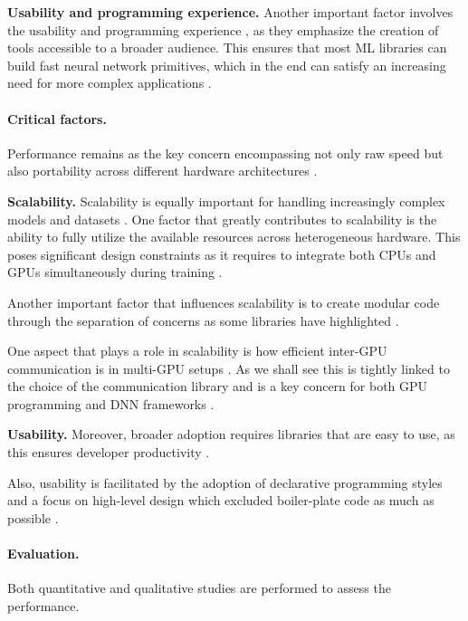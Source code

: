 \textbf{Usability and programming experience.}
Another important factor involves the usability and programming experience ,
as they emphasize the creation of tools accessible to a broader audience. This ensures that most
ML libraries can build fast neural network primitives, which in the end can satisfy an increasing
need for more complex applications .

\paragraph{Critical factors.}
Performance remains as the key concern encompassing not only raw speed but also portability across
different hardware architectures .

\textbf{Scalability.}
Scalability is equally important for handling increasingly complex models and datasets .
One factor that greatly contributes to scalability is the ability to fully utilize the available resources
across heterogeneous hardware. This poses significant design constraints as it requires to integrate
both CPUs and GPUs simultaneously during training .

Another important factor that influences scalability is to create modular code through the
separation of concerns as some libraries have highlighted .

One aspect that plays a role in scalability is how efficient inter-GPU communication is in
multi-GPU setups . As we shall see this is tightly linked to the choice of the
communication library and is a key concern for both GPU programming and DNN frameworks
\cite{noauthor_uxlfoundationoneccl_2025,noauthor_nvidianccl_2025,noauthor_rocmrccl_2025}.

\textbf{Usability.}
Moreover, broader adoption requires libraries that are easy to use, as this ensures developer productivity
.

Also, usability is facilitated by the adoption of declarative programming styles and a focus on
high-level design which excluded boiler-plate code as much as possible .

\paragraph{Evaluation.}
Both quantitative and qualitative studies are performed to assess the performance.

